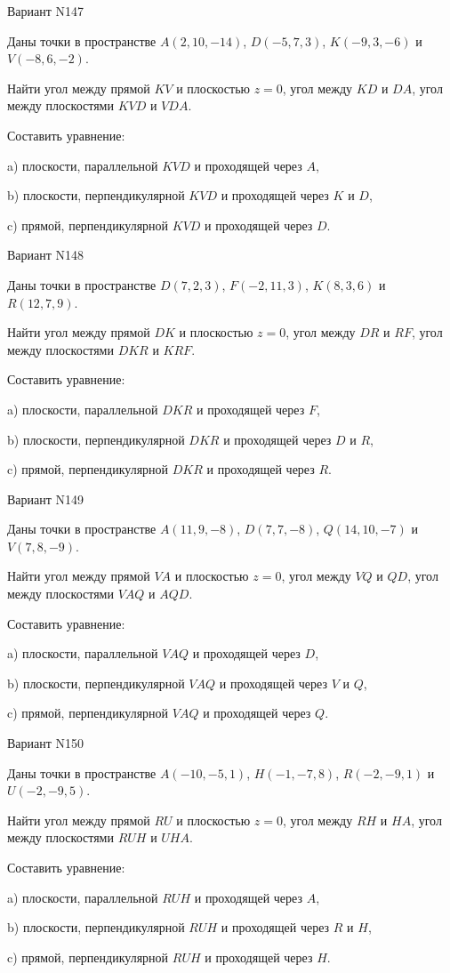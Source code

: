 \documentclass[11pt]{report}
\begin{document}
Вариант N147

Даны точки в пространстве
$A(2, 10, -14)$, $D(-5, 7, 3)$, $K(-9, 3, -6)$ и
$V(-8, 6, -2)$.

Найти угол между прямой $KV$ и плоскостью $z = 0$, угол между $KD$ и $DA$, угол между плоскостями $KVD$ 
и $VDA$.

Составить уравнение: 

a) плоскости, параллельной $KVD$ и проходящей через $A$,

b) плоскости, перпендикулярной $KVD$ и проходящей через $K$ и $D$,

c) прямой, перпендикулярной $KVD$ и проходящей через $D$.

Вариант N148

Даны точки в пространстве
$D(7, 2, 3)$, $F(-2, 11, 3)$, $K(8, 3, 6)$ и
$R(12, 7, 9)$.

Найти угол между прямой $DK$ и плоскостью $z = 0$, угол между $DR$ и $RF$, угол между плоскостями $DKR$ 
и $KRF$.

Составить уравнение: 

a) плоскости, параллельной $DKR$ и проходящей через $F$,

b) плоскости, перпендикулярной $DKR$ и проходящей через $D$ и $R$,

c) прямой, перпендикулярной $DKR$ и проходящей через $R$.

Вариант N149

Даны точки в пространстве
$A(11, 9, -8)$, $D(7, 7, -8)$, $Q(14, 10, -7)$ и
$V(7, 8, -9)$.

Найти угол между прямой $VA$ и плоскостью $z = 0$, угол между $VQ$ и $QD$, угол между плоскостями $VAQ$ 
и $AQD$.

Составить уравнение: 

a) плоскости, параллельной $VAQ$ и проходящей через $D$,

b) плоскости, перпендикулярной $VAQ$ и проходящей через $V$ и $Q$,

c) прямой, перпендикулярной $VAQ$ и проходящей через $Q$.

Вариант N150

Даны точки в пространстве
$A(-10, -5, 1)$, $H(-1, -7, 8)$, $R(-2, -9, 1)$ и
$U(-2, -9, 5)$.

Найти угол между прямой $RU$ и плоскостью $z = 0$, угол между $RH$ и $HA$, угол между плоскостями $RUH$ 
и $UHA$.

Составить уравнение: 

a) плоскости, параллельной $RUH$ и проходящей через $A$,

b) плоскости, перпендикулярной $RUH$ и проходящей через $R$ и $H$,

c) прямой, перпендикулярной $RUH$ и проходящей через $H$.
\end{document}

